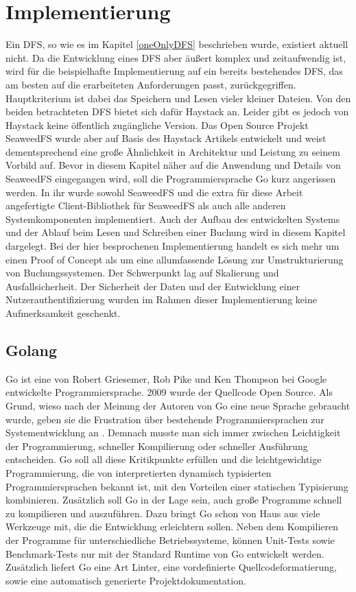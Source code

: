 \documentclass[12pt,oneside,a4paper,parskip]{scrbook}
\begin{document}
\chapter{Implementierung}
\label{implementation}
Ein DFS, so wie es im Kapitel \ref{oneOnlyDFS} beschrieben wurde, existiert aktuell nicht. Da die Entwicklung eines DFS aber äußert komplex und zeitaufwendig ist, wird für die beispielhafte Implementierung auf ein bereits bestehendes DFS, das am besten auf die erarbeiteten Anforderungen passt, zurückgegriffen. Hauptkriterium ist dabei das Speichern und Lesen vieler kleiner Dateien. Von den beiden betrachteten DFS bietet sich dafür Haystack an. Leider gibt es jedoch von Haystack keine öffentlich zugängliche Version. Das Open Source Projekt SeaweedFS wurde aber auf Basis des Haystack Artikels entwickelt und weist dementsprechend eine große Ähnlichkeit in Architektur und Leistung zu seinem Vorbild auf. Bevor in diesem Kapitel näher auf die Anwendung und Details von SeaweedFS eingegangen wird, soll die Programmiersprache Go kurz angerissen werden. In ihr wurde sowohl SeaweedFS und die extra für diese Arbeit angefertigte Client-Bibliothek für SeaweedFS als auch alle anderen Systemkomponenten implementiert. Auch der Aufbau des entwickelten Systems und der Ablauf beim Lesen und Schreiben einer Buchung wird in diesem Kapitel dargelegt. Bei der hier besprochenen Implementierung handelt es sich mehr um einen Proof of Concept als um eine allumfassende Lösung zur Umstrukturierung von Buchungssystemen. Der Schwerpunkt lag auf Skalierung und Ausfallsicherheit. Der Sicherheit der Daten und der Entwicklung einer Nutzerauthentifizierung wurden im Rahmen dieser Implementierung keine Aufmerksamkeit geschenkt.

\section{Golang}
Go ist eine von Robert Griesemer, Rob Pike und Ken Thompson bei Google entwickelte Programmiersprache. 2009 wurde der Quellcode Open Source. Als Grund, wieso nach der Meinung der Autoren von Go eine neue Sprache gebraucht wurde, geben sie die Frustration über bestehende Programmiersprachen zur Systementwicklung an \cite{gofaq}. Demnach musste man sich immer zwischen Leichtigkeit der Programmierung, schneller Kompilierung oder schneller Ausführung entscheiden. Go soll all diese Kritikpunkte erfüllen und die  leichtgewichtige Programmierung, die von interpretierten dynamisch typisierten Programmiersprachen bekannt ist, mit den Vorteilen einer statischen Typisierung kombinieren. Zusätzlich soll Go in der Lage sein, auch große Programme schnell zu kompilieren und auszuführen. Dazu bringt Go schon von Haus aus viele Werkzeuge mit, die die Entwicklung erleichtern sollen. Neben dem Kompilieren der Programme für unterschiedliche Betriebssysteme, können Unit-Tests sowie Benchmark-Tests nur mit der Standard Runtime von Go entwickelt werden. Zusätzlich liefert Go eine Art Linter, eine vordefinierte Quellcodeformatierung, sowie eine automatisch generierte Projektdokumentation.
\end{document}
